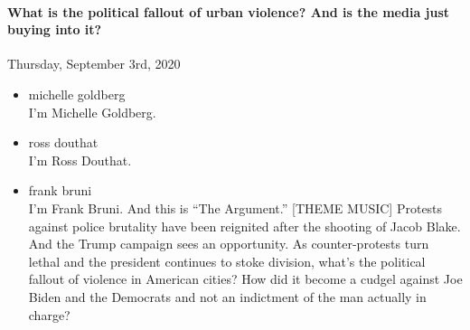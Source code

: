 \hypertarget{what-is-the-political-fallout-of-urban-violence-and-is-the-media-just-buying-into-it-2}{%
\paragraph{What is the political fallout of urban violence? And is the
media just buying into
it?}\label{what-is-the-political-fallout-of-urban-violence-and-is-the-media-just-buying-into-it-2}}

Thursday, September 3rd, 2020

\begin{itemize}
\item
  michelle goldberg\\
  I'm Michelle Goldberg.
\item
  ross douthat\\
  I'm Ross Douthat.
\item
  frank bruni\\
  I'm Frank Bruni. And this is ``The Argument.'' {[}THEME MUSIC{]}
  Protests against police brutality have been reignited after the
  shooting of Jacob Blake. And the Trump campaign sees an opportunity.
  As counter-protests turn lethal and the president continues to stoke
  division, what's the political fallout of violence in American cities?
  How did it become a cudgel against Joe Biden and the Democrats and not
  an indictment of the man actually in charge?


\end{itemize}
